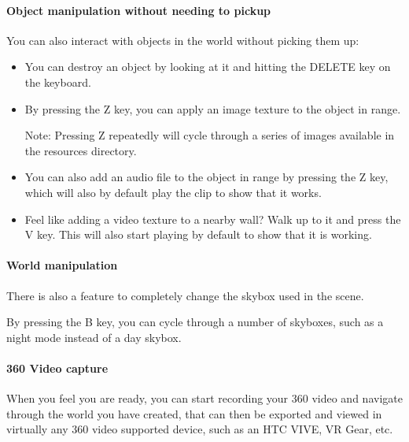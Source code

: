 			\paragraph{Object manipulation without needing to pickup}
			
			You can also interact with objects in the world without picking them up:
			
			\begin{itemize}
			
				\item You can destroy an object by looking at it and hitting the DELETE key on the keyboard.  
				
				\item By pressing the Z key, you can apply an image texture to the object in range.  
				
				Note: Pressing Z repeatedly will cycle through a series of images available in the resources directory.  
				
				\item You can also add an audio file to the object in range by pressing the Z key, which will also by default play the clip to show that it works.  
				
				\item Feel like adding a video texture to a nearby wall?  Walk up to it and press the V key.  This will also start playing by default to show that it is working.  
				
			\end{itemize}
			
			\paragraph{World manipulation}
			
			There is also a feature to completely change the skybox used in the scene.  
			
			By pressing the B key, you can cycle through a number of skyboxes, such as a night mode instead of a day skybox.  
			
			
			\paragraph{360 Video capture}
			
			When you feel you are ready, you can start recording your 360 video and navigate through the world you have created, that can then be exported and viewed in virtually any 360 video supported device, such as an HTC VIVE, VR Gear, etc.  
			
